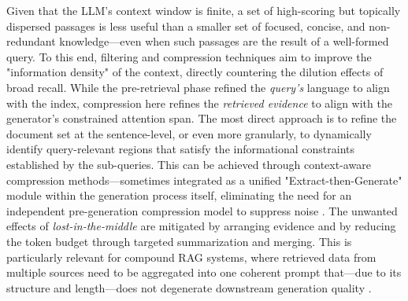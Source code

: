 \documentclass[11pt,a4paper]{article}
\begin{document}
Given that the LLM's context window is finite, a set of high-scoring but topically dispersed passages is less useful than a smaller set of focused, concise, and non-redundant knowledge---even when such passages are the result of a well-formed query. To this end, filtering and compression techniques aim to improve the "information density" of the context, directly countering the dilution effects of broad recall. While the pre-retrieval phase refined the \emph{query's} language to align with the index, compression here refines the \emph{retrieved evidence} to align with the generator's constrained attention span. The most direct approach is to refine the document set at the sentence-level, or even more granularly, to dynamically identify query-relevant regions that satisfy the informational constraints established by the sub-queries. This can be achieved through context-aware compression methods---sometimes integrated as a unified "Extract-then-Generate" module within the generation process itself, eliminating the need for an independent pre-generation compression model to suppress noise \cite{arxiv:2503.04789v3}. The unwanted effects of \emph{lost-in-the-middle} are mitigated by arranging evidence and by reducing the token budget through targeted summarization and merging. This is particularly relevant for compound RAG systems, where retrieved data from multiple sources need to be aggregated into one coherent prompt that---due to its structure and length---does not degenerate downstream generation quality \cite{arxiv:2407.01219v1}.
\end{document}
